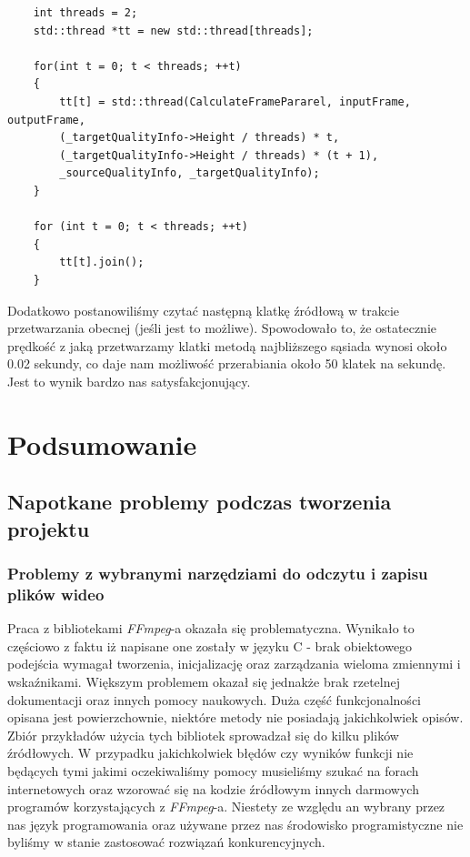 \documentclass[twoside]{projektInzynierskiMS}
\begin{document}
\begin{verbatim}
    int threads = 2;
    std::thread *tt = new std::thread[threads];

    for(int t = 0; t < threads; ++t)
    {
        tt[t] = std::thread(CalculateFramePararel, inputFrame, outputFrame,
        (_targetQualityInfo->Height / threads) * t, 
        (_targetQualityInfo->Height / threads) * (t + 1),
        _sourceQualityInfo, _targetQualityInfo);
    }

    for (int t = 0; t < threads; ++t)
    {
        tt[t].join();
    }
\end{verbatim}

Dodatkowo postanowiliśmy czytać następną klatkę źródłową w trakcie przetwarzania obecnej (jeśli jest to możliwe). Spowodowało to, że ostatecznie prędkość z jaką przetwarzamy klatki metodą najbliższego sąsiada wynosi około 0.02 sekundy, co daje nam możliwość przerabiania około 50 klatek na sekundę. Jest to wynik bardzo nas satysfakcjonujący.

\section{Podsumowanie}
\subsection{Napotkane problemy podczas tworzenia projektu}
\subsubsection{Problemy z wybranymi narzędziami do odczytu i zapisu plików wideo}
Praca z bibliotekami \emph{FFmpeg}-a okazała się problematyczna. Wynikało to częściowo z faktu iż napisane one zostały w języku C - brak obiektowego podejścia wymagał tworzenia, inicjalizację oraz zarządzania wieloma zmiennymi i wskaźnikami. Większym problemem okazał się jednakże brak rzetelnej dokumentacji oraz innych pomocy naukowych. Duża część funkcjonalności opisana jest powierzchownie, niektóre metody nie posiadają jakichkolwiek opisów. Zbiór przykładów użycia tych bibliotek sprowadzał się do kilku plików źródłowych. W przypadku jakichkolwiek błędów czy wyników funkcji nie będących tymi jakimi oczekiwaliśmy pomocy musieliśmy szukać na forach internetowych oraz wzorować się na kodzie źródłowym innych darmowych programów korzystających z \emph{FFmpeg}-a. Niestety ze względu an wybrany przez nas język programowania oraz używane przez nas środowisko programistyczne nie byliśmy w stanie zastosować rozwiązań konkurencyjnych.
\end{document}
